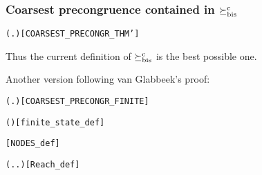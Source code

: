 \begin{frame}
\frametitle{Coarsest precongruence contained in $\mathrel{\succeq^\mathrm{c}_\mathrm{bis}}$}
\begin{theorem}
\begin{alltt}
\HOLTokenTurnstile{}   \HOLSymConst{\HOLTokenConj{}}   \HOLSymConst{\HOLTokenImp{}}
   ( \HOLSymConst{\HOLTokenObsContracts}  \HOLSymConst{\HOLTokenEquiv{}} \HOLSymConst{\HOLTokenForall{}}.  \HOLSymConst{\ensuremath{+}}  \HOLSymConst{\HOLTokenContracts{}}  \HOLSymConst{\ensuremath{+}} )\hfill{[COARSEST_PRECONGR_THM']}
\end{alltt}
Thus the current definition of $\mathrel{\succeq^\mathrm{c}_\mathrm{bis}}$ is the best possible one.
\end{theorem}

Another version following van Glabbeek's proof:
\begin{alltt}
\HOLTokenTurnstile{}   \HOLSymConst{\HOLTokenConj{}}   \HOLSymConst{\HOLTokenImp{}}
   ( \HOLSymConst{\HOLTokenObsContracts}  \HOLSymConst{\HOLTokenEquiv{}} \HOLSymConst{\HOLTokenForall{}}.  \HOLSymConst{\ensuremath{+}}  \HOLSymConst{\HOLTokenContracts{}}  \HOLSymConst{\ensuremath{+}} )\hfill{[COARSEST_PRECONGR_FINITE]}
\end{alltt}
\begin{small}
\begin{alltt}
  \HOLSymConst{\HOLTokenEquiv{}}  ( )\hfill{[finite_state_def]}

  \HOLSymConst{=} \HOLTokenLeftbrace{} \HOLTokenBar{}   \HOLTokenRightbrace{}\hfill{[NODES_def]}

 \HOLSymConst{=} (\HOLTokenLambda{} . \HOLSymConst{\HOLTokenExists{}}.  \HOLTokenTransBegin{}\HOLTokenTransEnd {})\HOLSymConst{\HOLTokenSupStar{}}\hfill{[Reach_def]}
\end{alltt}
\end{small}
\end{frame}

